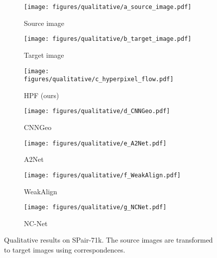 \documentclass[10pt,twocolumn,letterpaper]{article}
\begin{document}
\begin{figure*}[htbp]
    \centering
    \begin{subfigure}{0.144\textwidth}
        \texttt{[image: figures/qualitative/a\_source\_image.pdf]} 
        \caption{Source image}
    \end{subfigure}
    \hspace{-2.0mm}
    \begin{subfigure}{0.135\textwidth}
        \texttt{[image: figures/qualitative/b\_target\_image.pdf]}
        \caption{Target image}
    \end{subfigure}
    \hspace{-2.0mm}
    \begin{subfigure}{0.144\textwidth}
        \texttt{[image: figures/qualitative/c\_hyperpixel\_flow.pdf]}
        \caption{HPF (ours)}
    \end{subfigure}
    \hspace{-2.0mm}
    \begin{subfigure}{0.144\textwidth}
        \texttt{[image: figures/qualitative/d\_CNNGeo.pdf]}
        \caption{CNNGeo~\cite{Rocco17}}
    \end{subfigure}
    \hspace{-2.0mm}
    \begin{subfigure}{0.144\textwidth}
        \texttt{[image: figures/qualitative/e\_A2Net.pdf]}
        \caption{A2Net~\cite{paul2018attentive}}
    \end{subfigure}
    \hspace{-2.0mm}
    \begin{subfigure}{0.144\textwidth}
        \texttt{[image: figures/qualitative/f\_WeakAlign.pdf]}
        \caption{WeakAlign~\cite{Rocco18}}
    \end{subfigure}
    \hspace{-2.0mm}
    \begin{subfigure}{0.144\textwidth}
        \texttt{[image: figures/qualitative/g\_NCNet.pdf]}
        \caption{NC-Net~\cite{rocco2018neighbourhood}}
    \end{subfigure}
    \hspace{-2.0mm}
    \vspace{-3.0mm}
    \caption{Qualitative results on SPair-71k. The source images are transformed to target images using correspondences.}
    \label{fig:figure4}
    \vspace{-3.0mm}
\end{figure*}
\end{document}
